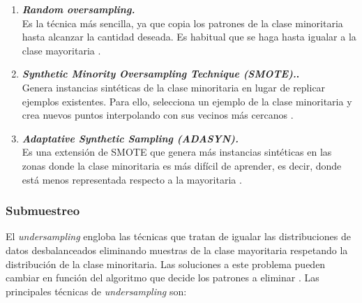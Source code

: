\begin{enumerate}
	\item \textbf{\textit{Random oversampling.}} \\
		Es la técnica más sencilla, ya que copia los patrones de la clase minoritaria hasta alcanzar la cantidad deseada. Es habitual que se haga hasta igualar a la clase mayoritaria \cite{resamplig}.
	\item \textbf{\textit{Synthetic Minority Oversampling Technique (SMOTE).}.} \\
		Genera instancias sintéticas de la clase minoritaria en lugar de replicar ejemplos existentes. Para ello, selecciona un ejemplo de la clase minoritaria y crea nuevos puntos interpolando con sus vecinos más cercanos \cite{ELREEDY201932}.
	\item \textbf{\textit{Adaptative Synthetic Sampling (ADASYN).}} \\
		Es una extensión de SMOTE que genera más instancias sintéticas en las zonas donde la clase minoritaria es más difícil de aprender, es decir, donde está menos representada respecto a la mayoritaria \cite{ADASYN}.
\end{enumerate}

\subsubsection{Submuestreo}
\label{subsubsec:undersampling}

El \textit{undersampling} engloba las técnicas que tratan de igualar las distribuciones de datos desbalanceados eliminando muestras de la clase mayoritaria respetando la distribución de la clase minoritaria. Las soluciones a este problema pueden cambiar en función del algoritmo que decide los patrones a eliminar \cite{resamplig}. Las principales técnicas de \textit{undersampling} son:

